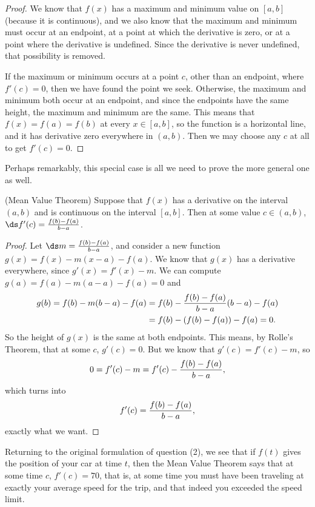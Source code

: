 \begin{proof}
We know that $f(x)$ has a maximum and minimum value on $[a,b]$
(because it is continuous), and we
also know that the maximum and minimum must occur at an endpoint, at a
point at which the derivative is zero, or at a point where the
derivative is undefined. Since the derivative is never undefined, that
possibility is removed.

If the maximum or minimum occurs at a point $c$, other than an endpoint,
where $f'(c)=0$, then we have found the point we seek. Otherwise, the
maximum and minimum both occur at an endpoint, and since the endpoints
have the same height, the maximum and minimum are the same. This means
that $f(x)=f(a)=f(b)$ at every $x \in [a,b]$, so the function is a
horizontal line, and it has derivative zero everywhere in
$(a,b)$. Then we may choose any $c$ at all to get $f'(c)=0$.
\end{proof}

Perhaps remarkably, this special case is all we need to prove the more
general one as well.

\begin{theorem} (Mean Value Theorem) 
\label{thm:mvt}
Suppose that $f(x)$ has a derivative on the
interval $(a,b)$ and is continuous on the interval $[a,b]$. 
Then at some value
$c\in (a,b)$, $\ds f'(c)={f(b)-f(a)\over b-a}$.
\end{theorem}

\begin{proof}
Let $\ds m={f(b)-f(a)\over b-a}$, and consider a new function
$g(x)=f(x) - m(x-a)-f(a)$. We know that $g(x)$ has a derivative
everywhere, since $g'(x)=f'(x)-m$. We can compute 
$g(a)=f(a)- m(a-a)-f(a) =0$ and
\begin{align*}
g(b)=f(b)-m(b-a)-f(a)&=f(b)-{f(b)-f(a)\over b-a}(b-a)-f(a) \\
&=f(b)-(f(b)-f(a))-f(a)=0. 
\end{align*}
So the height of $g(x)$ is the same at both endpoints. This means, by
Rolle's Theorem, that at some $c$, $g'(c)=0$. But we know that
$g'(c)=f'(c)-m$, so
$$0=f'(c)-m=f'(c)-{f(b)-f(a)\over b-a},$$
which turns into
$$f'(c)={f(b)-f(a)\over b-a},$$
exactly what we want.
\end{proof}

Returning to the original formulation of question (2), we see that if
$f(t)$ gives the position of your car at time $t$, then the Mean Value
Theorem says that at some time $c$, $f'(c)=70$, that is, at some time
you must have been traveling at exactly your average speed for the
trip, and that indeed you exceeded the speed limit.


